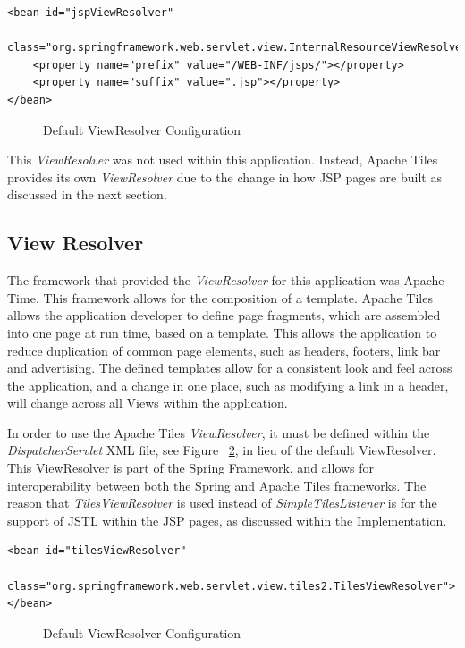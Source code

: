 \begin{lstlisting}
<bean id="jspViewResolver"
	class="org.springframework.web.servlet.view.InternalResourceViewResolver">
	<property name="prefix" value="/WEB-INF/jsps/"></property>
	<property name="suffix" value=".jsp"></property>
</bean>
\end{lstlisting}
\begin{figure}[H]
\caption{Default ViewResolver Configuration}
\label{fig:defaultViewRes}
\end{figure}

This \textit{ViewResolver} was not used within this application. Instead, Apache Tiles provides its own \textit{ViewResolver} due to the change in how JSP pages are built as discussed in the next section.

\subsection{View Resolver}

The framework that provided the \textit{ViewResolver} for this application was Apache Time. This framework allows for the composition of a template. Apache Tiles allows the application developer to define page fragments, which are assembled into one page at run time, based on a template. This allows the application to reduce duplication of common page elements, such as headers, footers, link bar and advertising.  The defined templates allow for a consistent look and feel across the application, and a change in one place, such as modifying a link in a header, will change across all Views within the application.

In order to use the Apache Tiles \textit{ViewResolver}, it must be defined within the \textit{DispatcherServlet} XML file, see Figure ~\ref{fig:tilesViewRes}, in lieu of the default ViewResolver. This ViewResolver is part of the Spring Framework, and allows for interoperability between both the Spring and Apache Tiles frameworks. The reason that \textit{TilesViewResolver} is used instead of \textit{SimpleTilesListener} is for the support of JSTL within the JSP pages, as discussed within the Implementation.

\begin{lstlisting}
<bean id="tilesViewResolver"
	class="org.springframework.web.servlet.view.tiles2.TilesViewResolver">
</bean>
\end{lstlisting}
\begin{figure}[H]
\caption{Default ViewResolver Configuration}
\label{fig:tilesViewRes}
\end{figure}

